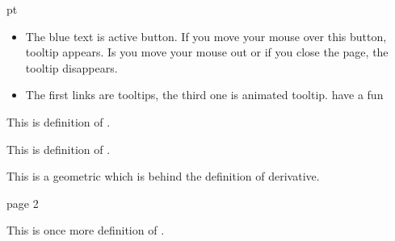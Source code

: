 \documentclass{article}
\begin{document}
 pt

\begin{itemize}
\item The blue text is active button. If you move your mouse over this
  button, tooltip appears. Is you move your mouse out or if you close
  the page, the tooltip disappears.
\item The first links are tooltips, the third one is animated tooltip.
  have a fun
\end{itemize}

  This is definition of  . 


  This is definition of . 

This is a geometric  which is behind the
definition of derivative.


\newpage
page 2 

This is once more definition  of  . 
\end{document}
